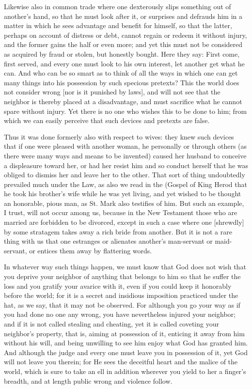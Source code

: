 Likewise also in common trade where one dexterously slips something out
of another's hand, so that he must look after it, or surprises and
defrauds him in a matter in which he sees advantage and benefit for
himself, so that the latter, perhaps on account of distress or debt,
cannot regain or redeem it without injury, and the former gains the
half or even more; and yet this must not be considered as acquired by
fraud or stolen, but honestly bought. Here they say: First come, first
served, and every one must look to his own interest, let another get
what he can. And who can be so smart as to think of all the ways in
which one can get many things into his possession by such specious
pretexts? This the world does not consider wrong [nor is it punished by
laws], and will not see that the neighbor is thereby placed at a
disadvantage, and must sacrifice what he cannot spare without injury.
Yet there is no one who wishes this to be done to him; from which we
can easily perceive that such devices and pretexts are false.

Thus it was done formerly also with respect to wives: they knew such
devices that if one were pleased with another woman, he personally or
through others (as there were many ways and means to be invented)
caused her husband to conceive a displeasure toward her, or had her
resist him and so conduct herself that he was obliged to dismiss her
and leave her to the other. That sort of thing undoubtedly prevailed
much under the Law, as also we read in the (Gospel of King Herod that
he took his brother's wife while he was yet living, and yet wished to
be thought an honorable, pious man, as St. Mark also testifies of him.
But such an example, I trust, will not occur among us, because in the
New Testament those who are married are forbidden to be divorced,
except in such a case where one [shrewdly] by some stratagem takes away
a rich bride from another. But it is not a rare thing with us that one
estranges or alienates another's man-servant or maid-servant, or
entices them away by flattering words.

In whatever way such things happen, we must know that God does not wish
that you deprive your neighbor of anything that belongs to him so that
he suffer the loss and you gratify your avarice with it, even if you
could keep it honorably before the world; for it is a secret and
insidious imposition practiced under the hat, as we say, that it may
not be observed. For although you go your way as if you had done no one
any wrong, you have nevertheless injured your neighbor; and if it is
not called stealing and cheating, yet it is called coveting your
neighbor's property, that is, aiming at possession of it, enticing it
away from him without his will, and being unwilling to see him enjoy
what God has granted him. And although the judge and every one must
leave you in possession of it, yet God will not leave you therein; for
He sees the deceitful heart and the malice of the world, which is sure
to take an ell in addition wherever you yield to her a finger's
breadth, and at length public wrong and violence follow.

